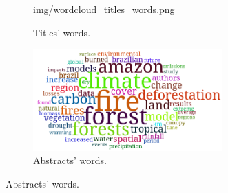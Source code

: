 \documentclass[aspectratio=169]{beamer}
\begin{document}
\begin{frame}
\begin{figure}
\begin{subfigure}{0.4\textwidth}
      {img/wordcloud_titles_words.png}
      \caption{Titles' words.}
      \label{fig:wordcloud_titles_words} 
    \end{subfigure}
    \begin{subfigure}{0.4\textwidth}
      \includegraphics[width=0.8\textwidth]
      {img/wordcloud_abstracts_words.png}
      \caption{Abstracts' words.}
      \label{fig:wordcloud_abstract_words} 
    \end{subfigure}
  \end{figure}
\end{frame}
\end{document}

